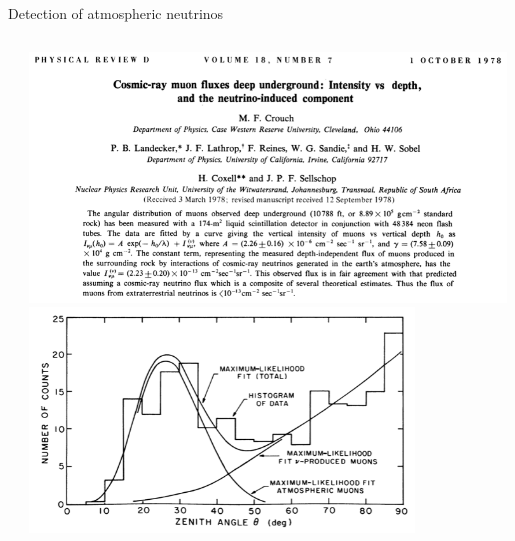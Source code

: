 \begin{frame}[t]{Detection of atmospheric neutrinos}
\begin{columns}
\begin{column}{0.38\textwidth}
\begin{itemize}
{           }
       \end{itemize}
  \end{column}
  \begin{column}{0.62\textwidth}
     \centering
      \includegraphics[width=0.99\textwidth]{./images/3nu/atmo/first_obs_abstract.png}\\
      \includegraphics[width=0.80\textwidth]{./images/3nu/atmo/first_obs_zenith.png}\\
  \end{column}
\end{columns}
\end{frame}


